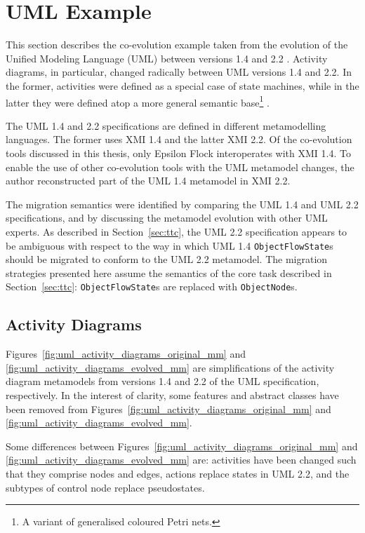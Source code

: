 \section{UML Example}
This section describes the co-evolution example taken from the evolution of the Unified Modeling Language (UML) between versions 1.4 \cite{uml14} and 2.2 \cite{uml22}. Activity diagrams, in particular, changed radically between UML versions 1.4 and 2.2. In the former, activities were defined as a special case of state machines, while in the latter they were defined atop a more general semantic base\footnote{A variant of generalised coloured Petri nets.} \cite{selic05uml2}.

The UML 1.4 and 2.2 specifications are defined in different metamodelling languages. The former uses XMI 1.4 and the latter XMI 2.2. Of the co-evolution tools discussed in this thesis, only Epsilon Flock interoperates with XMI 1.4. To enable the use of other co-evolution tools with the UML metamodel changes, the author reconstructed part of the UML 1.4 metamodel in XMI 2.2.

The migration semantics were identified by comparing the UML 1.4 and UML 2.2 specifications, and by discussing the metamodel evolution with other UML experts. As described in Section~\ref{sec:ttc}, the UML 2.2 specification appears to be ambiguous with respect to the way in which UML 1.4 \texttt{ObjectFlowState}s should be migrated to conform to the UML 2.2 metamodel. The migration strategies presented here assume the semantics of the core task described in Section~\ref{sec:ttc}: \texttt{ObjectFlowState}s are replaced with \texttt{ObjectNode}s.

\subsection{Activity Diagrams}
\label{subsec:uml_activity_diagrams}
Figures~\ref{fig:uml_activity_diagrams_original_mm} and \ref{fig:uml_activity_diagrams_evolved_mm} are simplifications of the activity diagram metamodels from versions 1.4 and 2.2 of the UML specification, respectively. In the interest of clarity, some features and abstract classes have been removed from Figures~\ref{fig:uml_activity_diagrams_original_mm} and \ref{fig:uml_activity_diagrams_evolved_mm}.


Some differences between Figures~\ref{fig:uml_activity_diagrams_original_mm} and \ref{fig:uml_activity_diagrams_evolved_mm} are: activities have been changed such that they comprise nodes and edges, actions replace states in UML 2.2, and the subtypes of control node replace pseudostates.

